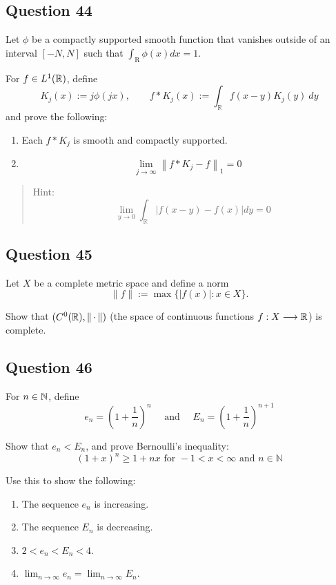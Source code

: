 \documentclass[12pt]{article}
\providecommand{\tightlist}{%
  \setlength{\itemsep}{0pt}\setlength{\parskip}{0pt}}
\begin{document}
\hypertarget{question-44-1}{%
\subsection{Question 44}\label{question-44-1}}

Let \(\phi\) be a compactly supported smooth function that vanishes
outside of an interval \([-N, N]\) such that
\(\int_{\mathrm{R}} \phi(x) d x=1\).

For \(f\in L^1({\mathbb{R}})\), define \[
K_{j}(x):=j \phi(j x), \quad \quad f \ast K_{j}(x):=\int_{\mathbb{R}} f(x-y) K_{j}(y) ~d y
\] and prove the following:

\begin{enumerate}
\def\labelenumi{\arabic{enumi}.}
\item
  Each \(f\ast K_j\) is smooth and compactly supported.
\item
  \[
  \lim _{j \rightarrow \infty}\left\|f * K_{j}-f\right\|_{1}=0
  \]
\end{enumerate}

\begin{quote}
Hint: \[
\lim _{y \rightarrow 0} \int_{\mathbb{R}}|f(x-y)-f(x)| d y=0
\]
\end{quote}

\hypertarget{question-45-1}{%
\subsection{Question 45}\label{question-45-1}}

Let \(X\) be a complete metric space and define a norm \[
\|f\|:=\max \{|f(x)|: x \in X\}.
\]

Show that \((C^0({\mathbb{R}}), {\left\lVert {{\,\cdot\,}} \right\rVert} )\) (the space of continuous
functions \(f: X\longrightarrow {\mathbb{R}}\)) is complete.

\hypertarget{question-46-1}{%
\subsection{Question 46}\label{question-46-1}}

For \(n\in {\mathbb{N}}\), define \[
e_{n}=\left(1+\frac{1}{n}\right)^{n} 
\quad \text { and } \quad 
E_{n}=\left(1+\frac{1}{n}\right)^{n+1}
\]

Show that \(e_n < E_n\), and prove Bernoulli's inequality: \[
(1+x)^{n} \geq 1+n x \text { for }-1<x<\infty \text { and } n \in \mathbb{N}
\]

Use this to show the following:

\begin{enumerate}
\def\labelenumi{\arabic{enumi}.}
\tightlist
\item
  The sequence \(e_n\) is increasing.
\item
  The sequence \(E_n\) is decreasing.
\item
  \(2 < e_n < E_n < 4\).
\item
  \(\lim _{n \rightarrow \infty} e_{n}=\lim _{n \rightarrow \infty} E_{n}\).
\end{enumerate}
\end{document}
